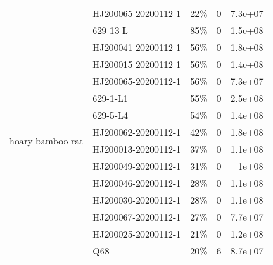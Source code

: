 \begin{tabular}{llrrr}
                  & HJ200065-20200112-1 &                                       22\% &                        0 &                   7.3e+07 \\
\cline{1-5}
\multirow{14}{*}{hoary bamboo rat} & 629-13-L &                                       85\% &                        0 &                   1.5e+08 \\
                  & HJ200041-20200112-1 &                                       56\% &                        0 &                   1.8e+08 \\
                  & HJ200015-20200112-1 &                                       56\% &                        0 &                   1.4e+08 \\
                  & HJ200065-20200112-1 &                                       56\% &                        0 &                   7.3e+07 \\
                  & 629-1-L1 &                                       55\% &                        0 &                   2.5e+08 \\
                  & 629-5-L4 &                                       54\% &                        0 &                   1.4e+08 \\
                  & HJ200062-20200112-1 &                                       42\% &                        0 &                   1.8e+08 \\
                  & HJ200013-20200112-1 &                                       37\% &                        0 &                   1.1e+08 \\
                  & HJ200049-20200112-1 &                                       31\% &                        0 &                     1e+08 \\
                  & HJ200046-20200112-1 &                                       28\% &                        0 &                   1.1e+08 \\
                  & HJ200030-20200112-1 &                                       28\% &                        0 &                   1.1e+08 \\
                  & HJ200067-20200112-1 &                                       27\% &                        0 &                   7.7e+07 \\
                  & HJ200025-20200112-1 &                                       21\% &                        0 &                   1.2e+08 \\
                  & Q68 &                                       20\% &                        6 &                   8.7e+07 \\

\end{tabular}
